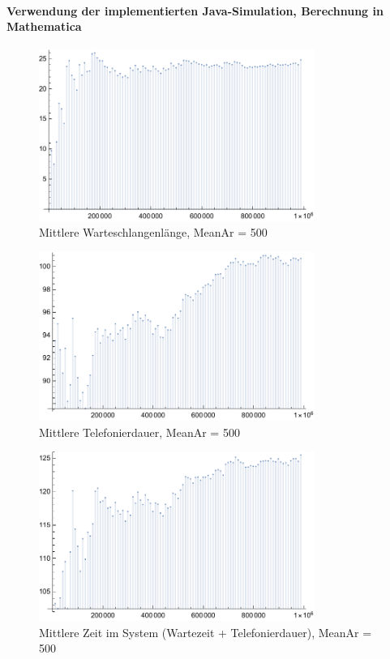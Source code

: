 \paragraph{Verwendung der implementierten Java-Simulation, Berechnung in Mathematica}
\begin{figure}[htpb]
	\centering
	\includegraphics[width=0.8\textwidth]{abbildungen/auswertung500/meanQueueTimePlot.pdf}
	\caption{Mittlere Warteschlangenlänge, MeanAr = 500}
	\label{fig:meanQueueTime500}
\end{figure}

\begin{figure}[htpb]
	\centering
	\includegraphics[width=0.8\textwidth]{abbildungen/auswertung500/meanCallingTimePlot.pdf}
	\caption{Mittlere Telefonierdauer, MeanAr = 500}
	\label{fig:meanCallingTime500}
\end{figure}

\begin{figure}[htpb]
	\centering
	\includegraphics[width=0.8\textwidth]{abbildungen/auswertung500/meanSystemTimePlot.pdf}
	\caption{Mittlere Zeit im System (Wartezeit + Telefonierdauer), MeanAr = 500}
	\label{fig:meanSystemTime500}
\end{figure}
